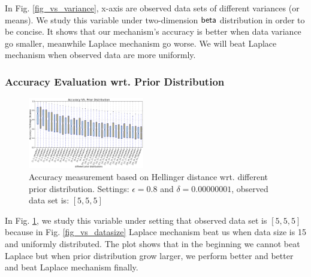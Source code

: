 \documentclass[sigconf, anonymous]{acmart}
\begin{document}
In Fig. \ref{fig_vs_variance}, x-axis are observed data sets of different variances (or means). We study this variable under two-dimension $\mathsf{beta}$ distribution in order to be concise. It shows that our mechanism's accuracy is better when data variance go smaller, meanwhile Laplace mechanism go worse. We will beat Laplace mechanism when observed data are more uniformly.



\subsubsection{Accuracy Evaluation wrt. Prior Distribution}
\label{subsubsec_vs_prior}

\begin{figure}[ht]
\centering
\includegraphics[width=0.45\textwidth]{accuracy_vs_prior_5_5_5.eps}
\caption{Accuracy measurement based on Hellinger distance wrt. different prior distribution. Settings: $\epsilon = 0.8$ and $\delta = 0.00000001$, observed data set is: $[5,5,5]$}
\label{fig_vs_prior}
\end{figure}

In Fig. \ref{fig_vs_prior}, we study this variable under setting that observed data set is $[5,5,5]$ because in Fig. \ref{fig_vs_datasize} Laplace mechanism beat us when data size is 15 and uniformly distributed. The plot shows that in the beginning we cannot beat Laplace but when prior distribution grow larger, we perform better and better and beat Laplace mechanism finally.




\end{document}
